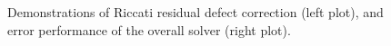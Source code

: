 \documentclass[10pt]{article}
\begin{document}
\begin{figure}[tb]  %
    \flushleft
    \caption{\label{convergence-plot}
      Demonstrations of Riccati residual defect correction (left plot), and error performance of the overall solver (right plot).
}
\end{figure}
\end{document}
